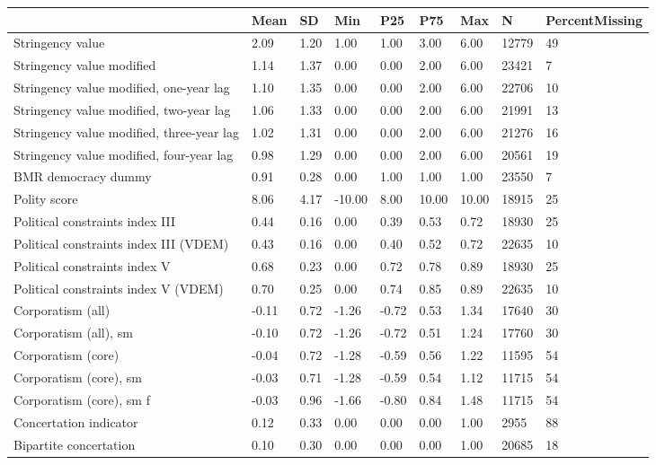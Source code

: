 
\begin{longtable}{lllllllll}
\toprule
  & Mean & SD & Min & P25 & P75 & Max & N & PercentMissing\\
\midrule
Stringency value & 2.09 & 1.20 & 1.00 & 1.00 & 3.00 & 6.00 & 12779 & 49\\
Stringency value modified & 1.14 & 1.37 & 0.00 & 0.00 & 2.00 & 6.00 & 23421 & 7\\
Stringency value modified, one-year lag & 1.10 & 1.35 & 0.00 & 0.00 & 2.00 & 6.00 & 22706 & 10\\
Stringency value modified, two-year lag & 1.06 & 1.33 & 0.00 & 0.00 & 2.00 & 6.00 & 21991 & 13\\
Stringency value modified, three-year lag & 1.02 & 1.31 & 0.00 & 0.00 & 2.00 & 6.00 & 21276 & 16\\
\addlinespace
Stringency value modified, four-year lag & 0.98 & 1.29 & 0.00 & 0.00 & 2.00 & 6.00 & 20561 & 19\\
BMR democracy dummy & 0.91 & 0.28 & 0.00 & 1.00 & 1.00 & 1.00 & 23550 & 7\\
Polity score & 8.06 & 4.17 & -10.00 & 8.00 & 10.00 & 10.00 & 18915 & 25\\
Political constraints index III & 0.44 & 0.16 & 0.00 & 0.39 & 0.53 & 0.72 & 18930 & 25\\
Political constraints index III (VDEM) & 0.43 & 0.16 & 0.00 & 0.40 & 0.52 & 0.72 & 22635 & 10\\
\addlinespace
Political constraints index V & 0.68 & 0.23 & 0.00 & 0.72 & 0.78 & 0.89 & 18930 & 25\\
Political constraints index V (VDEM) & 0.70 & 0.25 & 0.00 & 0.74 & 0.85 & 0.89 & 22635 & 10\\
Corporatism (all) & -0.11 & 0.72 & -1.26 & -0.72 & 0.53 & 1.34 & 17640 & 30\\
Corporatism (all), sm & -0.10 & 0.72 & -1.26 & -0.72 & 0.51 & 1.24 & 17760 & 30\\
Corporatism (core) & -0.04 & 0.72 & -1.28 & -0.59 & 0.56 & 1.22 & 11595 & 54\\
\addlinespace
Corporatism (core), sm & -0.03 & 0.71 & -1.28 & -0.59 & 0.54 & 1.12 & 11715 & 54\\
Corporatism (core), sm f & -0.03 & 0.96 & -1.66 & -0.80 & 0.84 & 1.48 & 11715 & 54\\
Concertation indicator & 0.12 & 0.33 & 0.00 & 0.00 & 0.00 & 1.00 & 2955 & 88\\
Bipartite concertation & 0.10 & 0.30 & 0.00 & 0.00 & 0.00 & 1.00 & 20685 & 18\\

\end{longtable}

